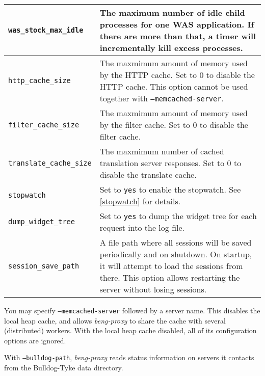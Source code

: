 \documentclass[a4paper,12pt]{article}
\begin{document}
\begin{longtable}{|l|p{8cm}|}
\hline

\verb|was_stock_max_idle| & The maximum number of idle child processes
for one WAS application.  If there are more than that, a timer will
incrementally kill excess processes. \\

\hline

\verb|http_cache_size| & The maxmimum amount of memory used by the
HTTP cache.  Set to 0 to disable the HTTP cache.  This option cannot
be used together with \texttt{--memcached-server}. \\

\hline

\verb|filter_cache_size| & The maxmimum amount of memory used by
the filter cache.  Set to 0 to disable the filter cache. \\

\hline

\verb|translate_cache_size| & The maxmimum number of cached
translation server responses.  Set to 0 to disable the translate
cache. \\

\hline

\verb|stopwatch| & Set to \texttt{yes} to enable the stopwatch.  See
\ref{stopwatch} for details. \\

\hline

\verb|dump_widget_tree| & Set to \texttt{yes} to dump the widget
tree for each request into the log file. \\

\hline

\verb|session_save_path| & A file path where all sessions will be
saved periodically and on shutdown.  On startup, it will attempt to
load the sessions from there.  This option allows restarting the
server without losing sessions.  \\

\hline
\end{longtable}

\label{memcached}
You may specify \texttt{--memcached-server} followed by a server name.
This disables the local heap cache, and allows \emph{beng-proxy} to
share the cache with several (distributed) workers.  With the local
heap cache disabled, all of its configuration options are ignored.

\label{bulldog}
With \texttt{--bulldog-path}, \emph{beng-proxy} reads status
information on servers it contacts from the Bulldog-Tyke data
directory.
\end{document}
